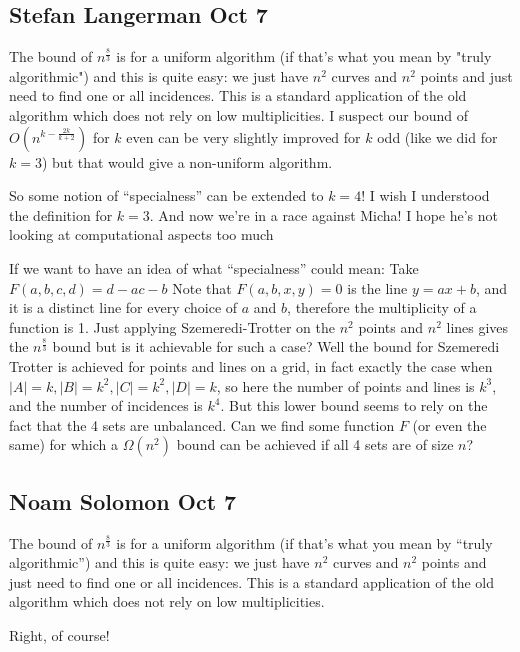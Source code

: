 \subsection{Stefan Langerman Oct 7}
The bound of $n^{\frac{8}{3}}$ is for a uniform algorithm (if that's what you
mean by "truly algorithmic") and this is quite easy:
we just have $n^2$ curves and $n^2$ points and just need to find one or
all incidences. This is a standard application of the old algorithm
which does not rely on low multiplicities. I suspect our bound of
$O(n^{k - \frac{2k}{k+2}})$ for $k$ even can be very slightly improved for $k$ odd
(like we did for $k=3$) but that would give a non-uniform algorithm.

So some notion of ``specialness'' can be extended to $k=4$! I wish I
understood the definition for $k=3$.
And now we're in a race against Micha! I hope he's not looking at
computational aspects too much

If we want to have an idea of what ``specialness'' could mean:
Take $F(a,b,c,d) = d-ac-b$
Note that $F(a,b,x,y)=0$ is the line $y=ax+b$, and it is a distinct line
for every choice of $a$ and $b$, therefore the multiplicity of a function
is 1. Just applying Szemeredi-Trotter on the $n^2$ points and $n^2$ lines
gives the $n^{\frac{8}{3}}$ bound but is it achievable for such a case? Well the
bound for Szemeredi Trotter is achieved for points and lines on a
grid, in fact exactly the case when
$|A|=k, |B|=k^2, |C|=k^2, |D|=k$, so here the number of points and lines
is $k^3$, and the number of incidences is $k^4$.
But this lower bound seems to rely on the fact that the 4 sets are
unbalanced. Can we find some function $F$ (or even the same) for which a
$\Omega(n^2)$ bound can be achieved if all 4 sets are of size $n$?

\subsection{Noam Solomon Oct 7}

\begin{displayquote}
The bound of $n^{\frac{8}{3}}$ is for a uniform algorithm (if that's what you
mean by ``truly algorithmic'') and this is quite easy:
we just have $n^2$ curves and $n^2$ points and just need to find one or
all incidences. This is a standard application of the old algorithm
which does not rely on low multiplicities.
\end{displayquote}

Right, of course!

